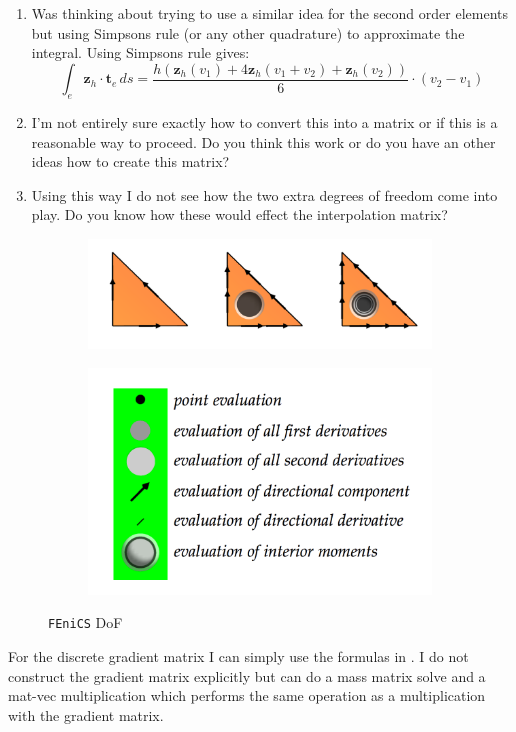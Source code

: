 \documentclass{article}
\newcommand{\uu}[1]{\boldsymbol #1}                     %
\newcommand{\fenics}{{\tt FEniCS} }
\begin{document}
\begin{enumerate}
    \item Was thinking about trying to use a similar idea for the second order elements but using Simpsons rule (or any other quadrature) to approximate the integral. Using Simpsons rule gives:
    $$ \int_e \uu{z}_h\cdot \uu{t}_e \, ds = \frac{h(\uu{z}_h(v_1) + 4 \uu{z}_h(v_1+v_2)+\uu{z}_h(v_2))}{6} \cdot (v_2-v_1) $$
    \item I'm not entirely sure exactly how to convert this into a matrix or if this is a reasonable way to proceed. Do you think this work or do you have an other ideas how to create this matrix?
    \item Using this way I do not see how the two extra degrees of freedom come into play. Do you know how these would effect the interpolation matrix?

\end{enumerate}

\begin{figure}[h!]
    \centering

    \begin{subfigure}{\textwidth}
        \centering
        \includegraphics[width=0.4\linewidth]{Figures/Nedelec}
    \end{subfigure}

    \begin{subfigure}{\textwidth}
        \centering
        \includegraphics[width=0.4\linewidth]{Figures/DOF}
    \end{subfigure}
    \caption{\fenics DoF}
    \label{fig:fenics}

\end{figure}

For the discrete gradient matrix I can simply use the formulas in \cite{greif2007preconditioners}. I do not construct the gradient matrix explicitly but can do a mass matrix solve and a mat-vec multiplication which performs the same operation as a multiplication with the gradient matrix.
\end{document}

